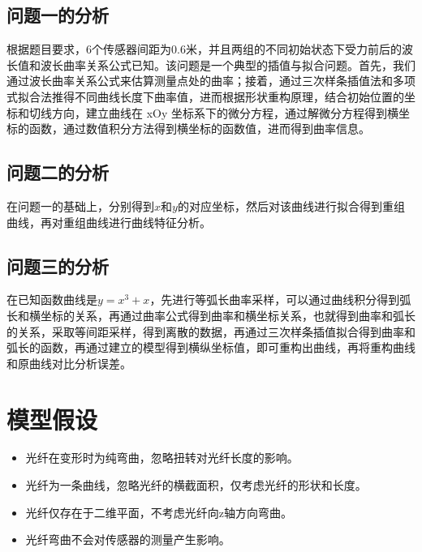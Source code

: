 \documentclass[withoutpreface,bwprint]{cumcmthesis}
\begin{document}
\subsection{问题一的分析}
根据题目要求，$6$个传感器间距为$0.6$米，并且两组的不同初始状态下受力前后的波长值和波长曲率关系公式已知。该问题是一个典型的插值与拟合问题。首先，我们通过波长曲率关系公式来估算测量点处的曲率；接着，通过三次样条插值法和多项式拟合法推得不同曲线长度下曲率值，进而根据形状重构原理，结合初始位置的坐标和切线方向，建立曲线在 xOy 坐标系下的微分方程，通过解微分方程得到横坐标的函数，通过数值积分方法得到横坐标的函数值，进而得到曲率信息。
\subsection{问题二的分析}
在问题一的基础上，分别得到$x$和$y$的对应坐标，然后对该曲线进行拟合得到重组曲线，再对重组曲线进行曲线特征分析。
\subsection{问题三的分析}
在已知函数曲线是$y=x^3+x$，先进行等弧长曲率采样，可以通过曲线积分得到弧长和横坐标的关系，再通过曲率公式得到曲率和横坐标关系，也就得到曲率和弧长的关系，采取等间距采样，得到离散的数据，再通过三次样条插值拟合得到曲率和弧长的函数，再通过建立的模型得到横纵坐标值，即可重构出曲线，再将重构曲线和原曲线对比分析误差。


\section{模型假设}
\begin{itemize}
\item 光纤在变形时为纯弯曲，忽略扭转对光纤长度的影响。
\item 光纤为一条曲线，忽略光纤的横截面积，仅考虑光纤的形状和长度。
\item 光纤仅存在于二维平面，不考虑光纤向z轴方向弯曲。
\item 光纤弯曲不会对传感器的测量产生影响。
\end{itemize}
\end{document}
